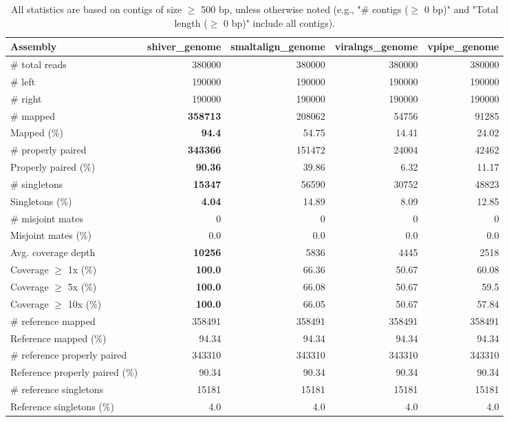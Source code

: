 \documentclass[12pt,a4paper]{article}
\begin{document}
\begin{table}[ht]
\begin{center}
\caption{All statistics are based on contigs of size $\geq$ 500 bp, unless otherwise noted (e.g., "\# contigs ($\geq$ 0 bp)" and "Total length ($\geq$ 0 bp)" include all contigs).}
\begin{tabular}{|l*{4}{|r}|}
\hline
Assembly & shiver\_genome & smaltalign\_genome & viralngs\_genome & vpipe\_genome \\ \hline
\# total reads & 380000 & 380000 & 380000 & 380000 \\ \hline
\# left & 190000 & 190000 & 190000 & 190000 \\ \hline
\# right & 190000 & 190000 & 190000 & 190000 \\ \hline
\# mapped & {\bf 358713} & 208062 & 54756 & 91285 \\ \hline
Mapped (\%) & {\bf 94.4} & 54.75 & 14.41 & 24.02 \\ \hline
\# properly paired & {\bf 343366} & 151472 & 24004 & 42462 \\ \hline
Properly paired (\%) & {\bf 90.36} & 39.86 & 6.32 & 11.17 \\ \hline
\# singletons & {\bf 15347} & 56590 & 30752 & 48823 \\ \hline
Singletons (\%) & {\bf 4.04} & 14.89 & 8.09 & 12.85 \\ \hline
\# misjoint mates & 0 & 0 & 0 & 0 \\ \hline
Misjoint mates (\%) & 0.0 & 0.0 & 0.0 & 0.0 \\ \hline
Avg. coverage depth & {\bf 10256} & 5836 & 4445 & 2518 \\ \hline
Coverage $\geq$ 1x (\%) & {\bf 100.0} & 66.36 & 50.67 & 60.08 \\ \hline
Coverage $\geq$ 5x (\%) & {\bf 100.0} & 66.08 & 50.67 & 59.5 \\ \hline
Coverage $\geq$ 10x (\%) & {\bf 100.0} & 66.05 & 50.67 & 57.84 \\ \hline
\# reference mapped & 358491 & 358491 & 358491 & 358491 \\ \hline
Reference mapped (\%) & 94.34 & 94.34 & 94.34 & 94.34 \\ \hline
\# reference properly paired & 343310 & 343310 & 343310 & 343310 \\ \hline
Reference properly paired (\%) & 90.34 & 90.34 & 90.34 & 90.34 \\ \hline
\# reference singletons & 15181 & 15181 & 15181 & 15181 \\ \hline
Reference singletons (\%) & 4.0 & 4.0 & 4.0 & 4.0 \\ \hline

\end{tabular}
\end{center}
\end{table}
\end{document}
